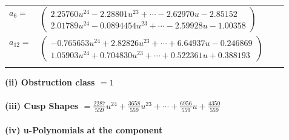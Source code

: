 \documentclass[1p]{elsarticle_modified}
\theoremstyle{definition}
\begin{document}
\begin{tabular}{m{7pt} m{180pt} m{7pt} m{180pt} }
\flushright $a_{6}=$&$\begin{pmatrix}2.25760 u^{24}-2.28801 u^{23}+\cdots-2.62970 u-2.85152\\2.01789 u^{24}-0.0894454 u^{23}+\cdots-2.59928 u-1.00358\end{pmatrix}$ \\
\flushright $a_{12}=$&$\begin{pmatrix}-0.765653 u^{24}+2.82826 u^{23}+\cdots+6.64937 u-0.246869\\1.05903 u^{24}+0.704830 u^{23}+\cdots+0.522361 u+0.388193\end{pmatrix}$\\&\end{tabular}
\flushleft \textbf{(ii) Obstruction class $= 1$}\\~\\
\flushleft \textbf{(iii) Cusp Shapes $= \frac{2287}{559} u^{24}+\frac{3658}{559} u^{23}+\cdots+\frac{6956}{559} u+\frac{4350}{559}$}\\~\\
\newpage\renewcommand{\arraystretch}{1}
\flushleft \textbf{(iv) u-Polynomials at the component}\newline \\
\end{document}

